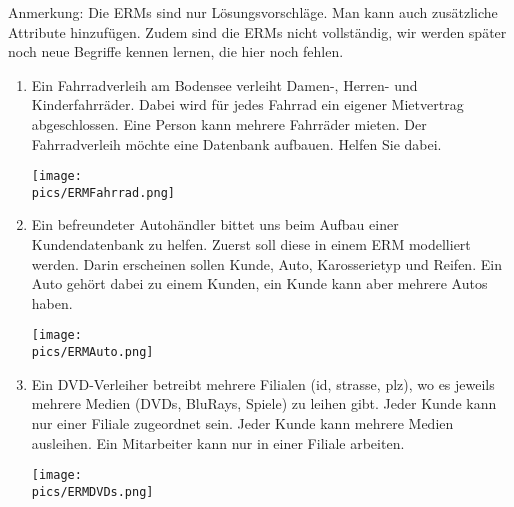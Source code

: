 \begin{Answer}[ref=ERMErstellen1]
	Anmerkung: Die ERMs sind nur Lösungsvorschläge. Man kann auch zusätzliche Attribute hinzufügen. Zudem sind die ERMs nicht vollständig, wir werden später noch neue Begriffe kennen lernen, die hier noch fehlen.
	\begin{enumerate}
		\item Ein Fahrradverleih am Bodensee verleiht Damen-, Herren- und Kinderfahrräder. Dabei wird für jedes Fahrrad ein eigener Mietvertrag abgeschlossen. Eine Person kann mehrere Fahrräder mieten. Der Fahrradverleih möchte eine Datenbank aufbauen. Helfen Sie dabei.

		\begin{minipage}{0.8\textwidth}
			\centering\texttt{[image: \\pics/ERMFahrrad.png]}
		\end{minipage}

		\item Ein befreundeter Autohändler bittet uns beim Aufbau einer Kundendatenbank zu helfen. Zuerst soll diese in einem ERM modelliert werden. Darin erscheinen sollen Kunde, Auto, Karosserietyp und Reifen. Ein Auto gehört dabei zu einem Kunden, ein Kunde kann aber mehrere Autos haben.

		\begin{minipage}{0.8\textwidth}
			\centering\texttt{[image: \\pics/ERMAuto.png]}
		\end{minipage}

		\item Ein DVD-Verleiher betreibt mehrere Filialen (id, strasse, plz), wo es jeweils mehrere Medien (DVDs, BluRays, Spiele) zu leihen gibt. Jeder Kunde kann nur einer Filiale zugeordnet sein. Jeder Kunde kann mehrere Medien ausleihen. Ein Mitarbeiter kann nur in einer Filiale arbeiten.

		\begin{minipage}{0.8\textwidth}
			\centering\texttt{[image: \\pics/ERMDVDs.png]}
		\end{minipage}
	\end{enumerate}
\end{Answer}

